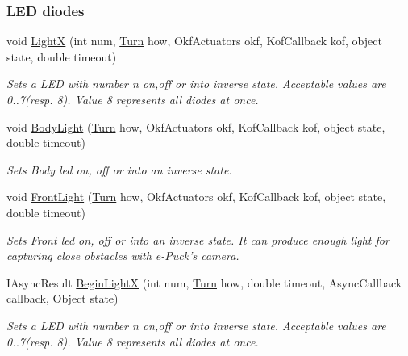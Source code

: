 \subsubsection*{LED diodes} %
\label{ssub:LED diodes}
  \begin{DoxyCompactItemize}

  \item void \hyperlink{class_elib_1_1_epuck_a2c17af7601d0b318f2272f87276c2e87}{LightX} (int num, \hyperlink{namespace_elib_a3bd21aa0f35c1f8d086ea6ac1e09a87c}{Turn} how, OkfActuators okf, KofCallback kof, object state, double timeout)
  \begin{DoxyCompactList}\small\item\em Sets a LED with number n on,off or into inverse state. Acceptable values are 0..7(resp. 8). Value 8 represents all diodes at once. \item\end{DoxyCompactList}

  \item void \hyperlink{class_elib_1_1_epuck_a237316be8571dde0ed2e9c0b2fca6321}{BodyLight} (\hyperlink{namespace_elib_a3bd21aa0f35c1f8d086ea6ac1e09a87c}{Turn} how, OkfActuators okf, KofCallback kof, object state, double timeout)
  \begin{DoxyCompactList}\small\item\em Sets Body led on, off or into an inverse state. \item\end{DoxyCompactList}

  \item void \hyperlink{class_elib_1_1_epuck_a17d5e4e8c2755b6eff667784aa2a12a1}{FrontLight} (\hyperlink{namespace_elib_a3bd21aa0f35c1f8d086ea6ac1e09a87c}{Turn} how, OkfActuators okf, KofCallback kof, object state, double timeout)
  \begin{DoxyCompactList}\small\item\em Sets Front led on, off or into an inverse state. It can produce enough light for capturing close obstacles with e-\/Puck's camera. \item\end{DoxyCompactList}

  \item  IAsyncResult \hyperlink{class_elib_1_1_epuck_ac5cbe768e3e85fc8c627331e539221a1}{BeginLightX} (int num, \hyperlink{namespace_elib_a3bd21aa0f35c1f8d086ea6ac1e09a87c}{Turn} how, double timeout, AsyncCallback callback, Object state)
  \begin{DoxyCompactList}\small\item\em Sets a LED with number n on,off or into inverse state. Acceptable values are 0..7(resp. 8). Value 8 represents all diodes at once. \item\end{DoxyCompactList}
  

\end{DoxyCompactItemize}
